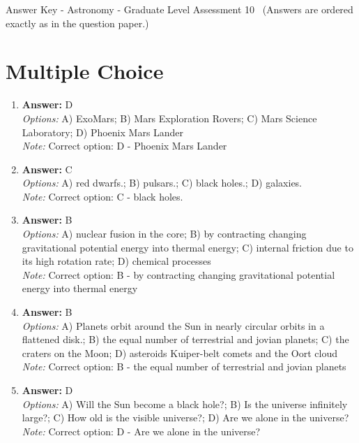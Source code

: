 \documentclass[12pt]{article}
\begin{document}
\begin{center}
Answer Key - Astronomy - Graduate Level Assessment 10 \
\small (Answers are ordered exactly as in the question paper.)
\end{center}

\section*{Multiple Choice}
\begin{enumerate}[label=\arabic*.]
\item \textbf{Answer:} D
\\ \textit{Options:} A) ExoMars; B) Mars Exploration Rovers; C) Mars Science Laboratory; D) Phoenix Mars Lander
\\ \textit{Note:} Correct option: D - Phoenix Mars Lander
\item \textbf{Answer:} C
\\ \textit{Options:} A) red dwarfs.; B) pulsars.; C) black holes.; D) galaxies.
\\ \textit{Note:} Correct option: C - black holes.
\item \textbf{Answer:} B
\\ \textit{Options:} A) nuclear fusion in the core; B) by contracting changing gravitational potential energy into thermal energy; C) internal friction due to its high rotation rate; D) chemical processes
\\ \textit{Note:} Correct option: B - by contracting changing gravitational potential energy into thermal energy
\item \textbf{Answer:} B
\\ \textit{Options:} A) Planets orbit around the Sun in nearly circular orbits in a flattened disk.; B) the equal number of terrestrial and jovian planets; C) the craters on the Moon; D) asteroids Kuiper-belt comets and the Oort cloud
\\ \textit{Note:} Correct option: B - the equal number of terrestrial and jovian planets
\item \textbf{Answer:} D
\\ \textit{Options:} A) Will the Sun become a black hole?; B) Is the universe infinitely large?; C) How old is the visible universe?; D) Are we alone in the universe?
\\ \textit{Note:} Correct option: D - Are we alone in the universe?
\end{enumerate}
\end{document}
